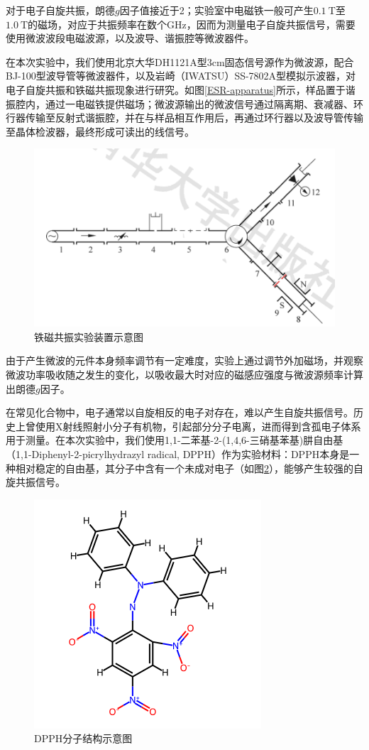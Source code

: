 \documentclass{thuemp}
\begin{document}
    对于电子自旋共振，朗德$g$因子值接近于2；实验室中电磁铁一般可产生$0.1 ~\text{T} $至$1.0~\text{T}$的磁场，对应于共振频率在数个\si{\giga\hertz}，因而为测量电子自旋共振信号，需要使用微波波段电磁波源，以及波导、谐振腔等微波器件。
    
    在本次实验中，我们使用北京大华DH1121A型3\si{\centi\meter}固态信号源作为微波源，配合BJ-100型波导管等微波器件，以及岩崎（IWATSU）SS-7802A型模拟示波器，对电子自旋共振和铁磁共振现象进行研究。如图\ref{ESR-apparatus}所示，样品置于谐振腔内，通过一电磁铁提供磁场；微波源输出的微波信号通过隔离期、衰减器、环行器传输至反射式谐振腔，并在与样品相互作用后，再通过环行器以及波导管传输至晶体检波器，最终形成可读出的线信号。
    
    \begin{figure}[H]
        \centering
        \includegraphics[width=0.8\linewidth]{./ESR-apparatus.png}
        \caption{铁磁共振实验装置示意图} \label{fig:ESR-apparatus}
    \end{figure}
    
    由于产生微波的元件本身频率调节有一定难度，实验上通过调节外加磁场，并观察微波功率吸收随之发生的变化，以吸收最大时对应的磁感应强度与微波源频率计算出朗德$g$因子。
    
    在常见化合物中，电子通常以自旋相反的电子对存在，难以产生自旋共振信号。历史上曾使用X射线照射小分子有机物，引起部分分子电离，进而得到含孤电子体系用于测量。在本次实验中，我们使用1,1-二苯基-2-(1,4,6-三硝基苯基)肼自由基（1,1-Diphenyl-2-picrylhydrazyl radical, DPPH）作为实验材料：DPPH本身是一种相对稳定的自由基，其分子中含有一个未成对电子（如图\ref{fig:DPPH}），能够产生较强的自旋共振信号。\
    
    \begin{figure}[H]
        \centering
        \includegraphics[width=0.5\linewidth]{./DPPH_molecule.png}
        \caption{DPPH分子结构示意图} \label{fig:DPPH}
    \end{figure}
    
\end{document}
